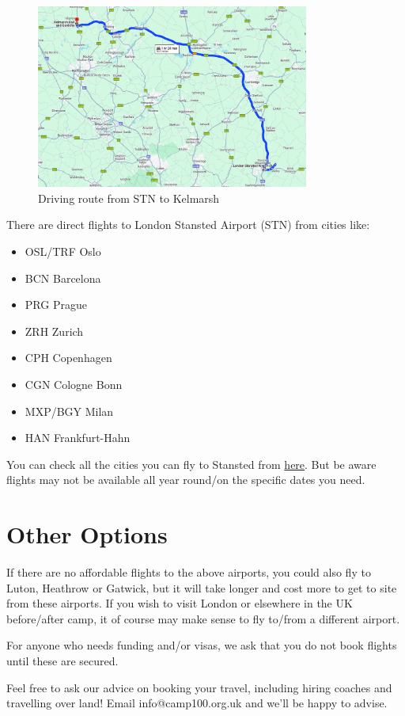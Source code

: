 \documentclass[a4paper, 11pt]{article}
\begin{document}
\begin{figure}[H]
    \centering
    \includegraphics[width=0.8\textwidth]{assets/stn.png}
    \caption{Driving route from STN to Kelmarsh}
\end{figure}

There are direct flights to London Stansted Airport (STN) from cities like:
\begin{multicols}{2}
    \begin{itemize}
        \item OSL/TRF Oslo 
        \item BCN Barcelona 
        \item PRG Prague 
        \item ZRH Zurich 
        \item CPH Copenhagen
        \item CGN Cologne Bonn
        \item MXP/BGY Milan
        \item HAN Frankfurt-Hahn 
    \end{itemize}
\end{multicols}
You can check all the cities you can fly to Stansted from \href{https://www.stanstedairport.com/destinations-and-guides/a-z-list-of-destinations/}{here}. But be aware flights may not be available all year round/on the specific dates you need.

\section{Other Options}
If there are no affordable flights to the above airports, you could also fly to Luton, Heathrow or Gatwick, but it will take longer and cost more to get to site from these airports. If you wish to visit London or elsewhere in the UK before/after camp, it of course may make sense to fly to/from a different airport. 

For anyone who needs funding and/or visas, we ask that you do not book flights until these are secured. 

Feel free to ask our advice on booking your travel, including hiring coaches and travelling over land! Email info@camp100.org.uk and we'll be happy to advise.

\makedocumentbackpage
\end{document}

